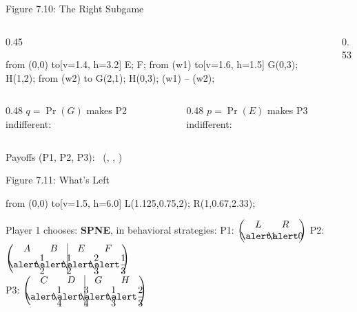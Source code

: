 \begin{frame}{Figure 7.10: The Right Subgame}
\begin{columns}[c]
    \begin{column}{0.45\textwidth}
        \centering
        {%
        \begin{gametree}[player names={2, 3}]
          \branch[player=1, root=w, label=90] from (0,0) to[v=1.4, h=3.2] {E; F};
          \branch[player=2, label=none] from (w1) to[v=1.6, h=1.5] {G(0,3); H(1,2)};
          \branch[label=none] from (w2) to {G(2,1); H(0,3)};
          \informset[player=2] (w1) -- (w2);
        \end{gametree}}
    \end{column}
    \begin{column}{0.53\textwidth}
        \centering
        {%
        \begin{matrixgame}[top={G, H}, left={E, F}, player names={Player 2, Player 3}]
        \end{matrixgame}}
    \end{column}
\end{columns}
\bsk
\begin{columns}[T]
\begin{column}{0.48\textwidth}
$q=\Pr(G)$ makes P2 indifferent:\\[4pt]
\end{column}
\begin{column}{0.48\textwidth}
$p=\Pr(E)$ makes P3 indifferent:\\[4pt]
\end{column}
\end{columns}
\vspace{0.25in}

Payoffs (P1, P2, P3): \ (, , )
\vspace{-0.3in}
\end{frame}

\begin{frame}{Figure 7.11: What's Left}
\centering
\begin{gametree}[player names={1, 2, 3}, scale=1.0]
  \branch[player=1, root=w, label=90] from (0,0) to[v=1.5, h=6.0] {L(1.125,0.75,2); R(1,0.67,2.33)};
\end{gametree}
\bsk
\raggedright
Player 1 chooses: 
\bsk
\textbf{SPNE}, in behavioral strategies:
\bsk
\centering
P1: $\beh{L & R}{\ans{0.25in}{$1$} & \ans{0.25in}{$0$}}$
\qquad
P2: $\beh[cc|cc]{A & B & E & F}{\ans{0.25in}{$\dfrac12$} & \ans{0.25in}{$\dfrac12$} & \ans{0.25in}{$\dfrac23$} & \ans{0.25in}{$\dfrac13$}}$
\\[10pt]
P3: $\beh[cc|cc]{C & D & G & H}{\ans{0.25in}{$\dfrac14$} & \ans{0.25in}{$\dfrac34$} & \ans{0.25in}{$\dfrac13$} & \ans{0.25in}{$\dfrac23$}}$
\vspace{-0.3in}
\end{frame}

